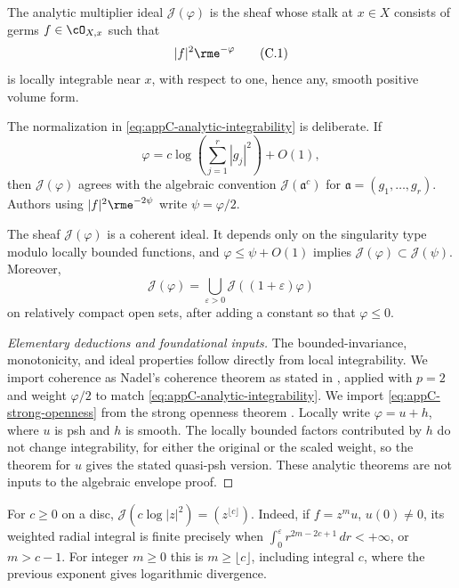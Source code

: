 \begin{definition}
\label{def:appC-analytic-multiplier}
The analytic multiplier ideal \(\mathcal J(\varphi)\) is the sheaf whose
stalk at \(x\in X\) consists of germs \(f\in\cO_{X,x}\) such that
\[
 |f|^2\rme^{-\varphi}
\tag{C.1}\label{eq:appC-analytic-integrability}
\]
is locally integrable near \(x\), with respect to one, hence any, smooth
positive volume form.
\end{definition}

The normalization in \eqref{eq:appC-analytic-integrability} is deliberate.
If
\[
 \varphi=c\log\left(\sum_{j=1}^r|g_j|^2\right)+O(1),
\tag{C.2}\label{eq:appC-analytic-singularity}
\]
then \(\mathcal J(\varphi)\) agrees with the algebraic convention
\(\mathcal J(\mathfrak a^c)\) for
\(\mathfrak a=(g_1,\ldots,g_r)\).  Authors using
\(|f|^2\rme^{-2\psi}\) write \(\psi=\varphi/2\).

\begin{theorem}\label{thm:appC-coherence-openness}
The sheaf \(\mathcal J(\varphi)\) is a coherent ideal.  It depends only on
the singularity type modulo locally bounded functions, and
\(\varphi\leq\psi+O(1)\) implies
\(\mathcal J(\varphi)\subset\mathcal J(\psi)\).  Moreover,
\[
 \mathcal J(\varphi)
   =\bigcup_{\varepsilon>0}\mathcal J((1+\varepsilon)\varphi)
\tag{C.3}\label{eq:appC-strong-openness}
\]
on relatively compact open sets, after adding a constant so that
\(\varphi\leq0\).
\end{theorem}

\begin{proof}[Elementary deductions and foundational inputs]
The bounded-invariance, monotonicity, and ideal properties follow directly
from local integrability.  We import coherence as Nadel's coherence theorem
as stated in \cite[Theorem~10.20]{Bou17}, applied with \(p=2\) and
weight \(\varphi/2\) to match \eqref{eq:appC-analytic-integrability}.  We import
\eqref{eq:appC-strong-openness} from the strong openness theorem
\cite[Theorem~1.1]{GZ15}.  Locally write \(\varphi=u+h\), where \(u\)
is psh and \(h\) is smooth.  The locally bounded factors contributed by
\(h\) do not change integrability, for either the original or the scaled
weight, so the theorem for \(u\) gives the stated quasi-psh version.
These analytic theorems are not inputs to the
algebraic envelope proof.
\end{proof}

\begin{example}
\label{ex:appC-disc-multiplier}
For \(c\geq0\) on a disc,
\(\mathcal J(c\log|z|^2)=(z^{\lfloor c\rfloor})\).
Indeed, if \(f=z^m u\), \(u(0)\ne0\), its weighted radial integral is
finite precisely when
\(\int_0^\varepsilon r^{2m-2c+1}\,dr<+\infty\), or \(m>c-1\).
For integer \(m\geq0\) this is \(m\geq\lfloor c\rfloor\), including
integral \(c\), where the previous exponent gives logarithmic divergence.
\end{example}


